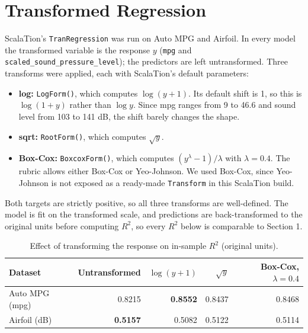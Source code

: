 \documentclass[11pt]{article}
\begin{document}
\clearpage
\section{Transformed Regression}
ScalaTion's \texttt{TranRegression} was run on Auto MPG and Airfoil. In
every model the transformed variable is the response $y$ (\texttt{mpg} and
\texttt{scaled\_sound\_pressure\_level}); the predictors are left
untransformed. Three transforms were applied, each with ScalaTion's default
parameters:
\begin{itemize}
    \item \textbf{log:} \texttt{LogForm()}, which computes $\log(y+1)$. Its
    default shift is 1, so this is $\log(1+y)$ rather than $\log y$. Since
    mpg ranges from 9 to 46.6 and sound level from 103 to 141 dB, the shift
    barely changes the shape.
    \item \textbf{sqrt:} \texttt{RootForm()}, which computes $\sqrt{y}$.
    \item \textbf{Box-Cox:} \texttt{BoxcoxForm()}, which computes
    $(y^{\lambda}-1)/\lambda$ with $\lambda=0.4$. The rubric allows either
    Box-Cox or Yeo-Johnson. We used Box-Cox, since Yeo-Johnson is not exposed
    as a ready-made \texttt{Transform} in this ScalaTion build.
\end{itemize}
Both targets are strictly positive, so all three transforms are well-defined.
The model is fit on the transformed scale, and predictions are
back-transformed to the original units before computing $R^2$, so every
$R^2$ below is comparable to Section 1.

\begin{table}[H]
\centering
\caption{Effect of transforming the response on in-sample $R^2$ (original
units).}
\begin{tabular}{lrrrr}
\toprule
Dataset & Untransformed & $\log(y+1)$ & $\sqrt{y}$ & Box-Cox, $\lambda=0.4$ \\
\midrule
Auto MPG (mpg) & 0.8215 & \textbf{0.8552} & 0.8437 & 0.8468 \\
Airfoil (dB) & \textbf{0.5157} & 0.5082 & 0.5122 & 0.5114 \\
\bottomrule
\end{tabular}
\end{table}
\end{document}
